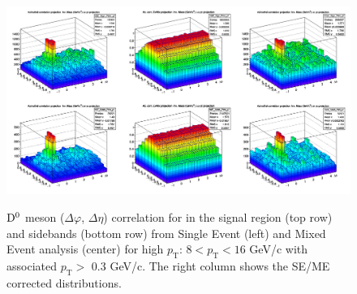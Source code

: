 \begin{figure}
\centering
{\includegraphics[width=1\linewidth]{figures/Dzero/CorrSEandME_Dzero_Canvas_PtIntBins9to11_pool7_thr0dot3to99dot0.png}}
 \caption{${\rm D^0}$ meson ($\Delta\varphi$, $ \Delta\eta$) correlation for in the signal region (top row) and sidebands (bottom row) from  Single Event (left) and Mixed Event analysis (center) for high $p_\mathrm{T}$: $8 < p_\mathrm{T}<16$ GeV/c with associated $p_\mathrm{T} >$ 0.3 GeV/c. The right column shows the SE/ME corrected distributions.}
\label{fig:DzeroME}
\end{figure}

